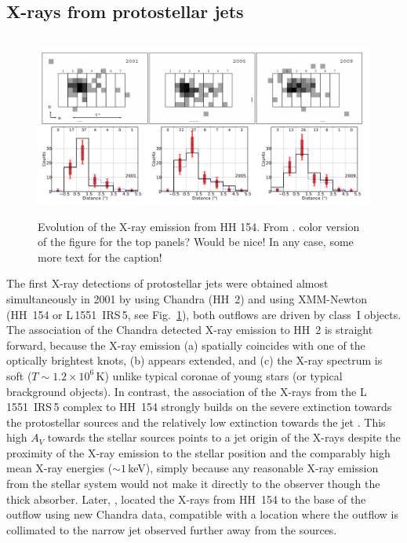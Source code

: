 

\subsection{X-rays from protostellar jets}

\begin{figure}[t]
\centering

\includegraphics[height=6cm]{figs/hh154}
\caption{Evolution of the X-ray emission from HH 154. From \citet{Schneider_2011}. \label{fig:hh154} {\color{red} color version of the figure for the top panels? Would be nice! In any case, some more text for the caption!}}
\end{figure}


The first X-ray detections of protostellar jets were obtained almost simultaneously in 2001 by \citet{Pravdo_2001} using Chandra (HH~2) and \citet{Favata_2002}
using XMM-Newton (HH~154 or L\,1551~IRS\,5, see Fig.~\ref{fig:hh154}), both outflows are driven by class~I objects. The association of the Chandra detected X-ray emission to HH~2 is straight forward, because the X-ray emission  (a) spatially coincides with one of the optically brightest knots, (b) appears extended, and (c) the X-ray spectrum is soft ($T\sim1.2\times10^6\,$K) unlike typical coronae of young stars (or typical brackground objects). In contrast, the association of the X-rays from the L\,1551~IRS\,5 complex to HH~154 strongly builds on the severe extinction towards the protostellar sources and the relatively low extinction towards the jet \citep[$A_V(jet)\sim10\,$mag vs $A_V(protostars)\gtrsim150$\,mag, e.g.,][]{White_2000,Fridlund_2005}. This high $A_V$ towards the stellar sources points to a jet origin of the X-rays despite the proximity of the X-ray emission to the stellar position and the comparably high mean X-ray energies ($\sim1\,$keV), simply because any reasonable X-ray emission from the stellar system would not make it directly to the observer though the thick absorber. Later, \citet{Bally_2003}, located the X-rays from HH~154 to the base of the outflow using new Chandra data, compatible with a location where the outflow is collimated to the narrow jet observed further away from the sources. 

